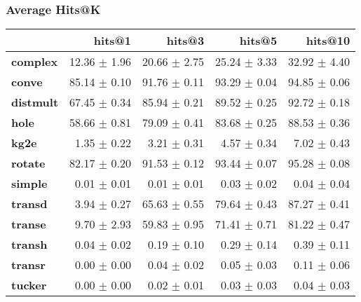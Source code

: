 \documentclass{article}
\begin{document}
    \subsubsection{Average Hits@K}
    \begin{center}
    \begin{tabular}{lrrrr}
\toprule
{} &        hits@1 &        hits@3 &        hits@5 &       hits@10 \\
\midrule
\textbf{complex } &  12.36 $\pm$ 1.96 &  20.66 $\pm$ 2.75 &  25.24 $\pm$ 3.33 &  32.92 $\pm$ 4.40 \\
\textbf{conve   } &  85.14 $\pm$ 0.10 &  91.76 $\pm$ 0.11 &  93.29 $\pm$ 0.04 &  94.85 $\pm$ 0.06 \\
\textbf{distmult} &  67.45 $\pm$ 0.34 &  85.94 $\pm$ 0.21 &  89.52 $\pm$ 0.25 &  92.72 $\pm$ 0.18 \\
\textbf{hole    } &  58.66 $\pm$ 0.81 &  79.09 $\pm$ 0.41 &  83.68 $\pm$ 0.25 &  88.53 $\pm$ 0.36 \\
\textbf{kg2e    } &   1.35 $\pm$ 0.22 &   3.21 $\pm$ 0.31 &   4.57 $\pm$ 0.34 &   7.02 $\pm$ 0.43 \\
\textbf{rotate  } &  82.17 $\pm$ 0.20 &  91.53 $\pm$ 0.12 &  93.44 $\pm$ 0.07 &  95.28 $\pm$ 0.08 \\
\textbf{simple  } &   0.01 $\pm$ 0.01 &   0.01 $\pm$ 0.01 &   0.03 $\pm$ 0.02 &   0.04 $\pm$ 0.04 \\
\textbf{transd  } &   3.94 $\pm$ 0.27 &  65.63 $\pm$ 0.55 &  79.64 $\pm$ 0.43 &  87.27 $\pm$ 0.41 \\
\textbf{transe  } &   9.70 $\pm$ 2.93 &  59.83 $\pm$ 0.95 &  71.41 $\pm$ 0.71 &  81.22 $\pm$ 0.47 \\
\textbf{transh  } &   0.04 $\pm$ 0.02 &   0.19 $\pm$ 0.10 &   0.29 $\pm$ 0.14 &   0.39 $\pm$ 0.11 \\
\textbf{transr  } &   0.00 $\pm$ 0.00 &   0.04 $\pm$ 0.02 &   0.05 $\pm$ 0.03 &   0.11 $\pm$ 0.06 \\
\textbf{tucker  } &   0.00 $\pm$ 0.00 &   0.02 $\pm$ 0.01 &   0.03 $\pm$ 0.03 &   0.04 $\pm$ 0.03 \\
\bottomrule
\end{tabular}

    \end{center}
\end{document}
